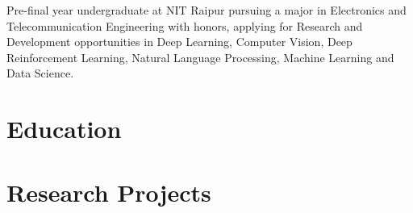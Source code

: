 \documentclass[11pt,a4paper,calibri]{moderncv}        %
\begin{document}
\makecvtitle
\vspace{-20pt}
\small{Pre-final year undergraduate at NIT Raipur pursuing a major in Electronics and Telecommunication Engineering with honors, applying for Research and Development opportunities in Deep Learning, Computer Vision, Deep Reinforcement Learning, Natural Language Processing, Machine Learning and Data Science.}
\renewcommand\UrlFont{\color{blue}\rmfamily}

\section{Education}

\begin{itemize}[leftmargin=0.0in]
\setlength\itemsep{.2em}
\vspace{-3pt}
\vspace{-3pt}
\end{itemize}

\vspace{-10pt}
\section{Research Projects}
\end{document}
